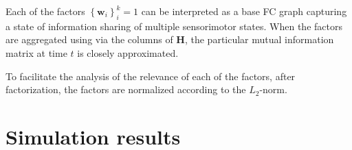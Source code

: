Each of the factors $\left\lbrace\bm{w}_i\right\rbrace^k_i=1$ can be interpreted as a base FC graph capturing
a state of information sharing of multiple sensorimotor states. When the factors are aggregated using via the columns of $\bm{H}$, the particular mutual information matrix at time $t$ is closely approximated.

To facilitate the analysis of the relevance of each of the factors, after factorization, the factors are normalized according to the $L_2$-norm. 

%




\section{Simulation results}

